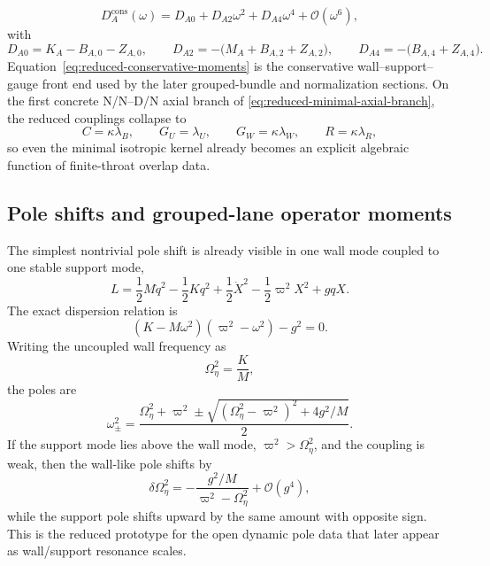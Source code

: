 \documentclass[11pt]{article}
\theoremstyle{definition}
\newcommand{\cO}{\mathcal O}
\begin{document}
\begin{equation}
D_A^{\mathrm{cons}}(\omega)
=
D_{A0}+D_{A2}\omega^2+D_{A4}\omega^4+\cO(\omega^6),
\label{eq:reduced-full-conservative-kernel}
\end{equation}
with
\begin{equation}
D_{A0}=K_A-B_{A,0}-Z_{A,0},
\qquad
D_{A2}=-\bigl(M_A+B_{A,2}+Z_{A,2}\bigr),
\qquad
D_{A4}=-\bigl(B_{A,4}+Z_{A,4}\bigr).
\label{eq:reduced-conservative-moments}
\end{equation}
Equation~\eqref{eq:reduced-conservative-moments} is the conservative wall--support--gauge front end used by the later grouped-bundle and normalization sections. On the first concrete N/N--D/N axial branch of \eqref{eq:reduced-minimal-axial-branch}, the reduced couplings collapse to
\[
C=\kappa\lambda_B,
\qquad
G_U=\lambda_U,
\qquad
G_W=\kappa\lambda_W,
\qquad
R=\kappa\lambda_R,
\]
so even the minimal isotropic kernel already becomes an explicit algebraic function of finite-throat overlap data.

\subsection{Pole shifts and grouped-lane operator moments}

The simplest nontrivial pole shift is already visible in one wall mode coupled to one stable support mode,
\begin{equation}
L
=
\frac12 M\dot q^2
-
\frac12 K q^2
+
\frac12 \dot X^2
-
\frac12 \varpi^2 X^2
+
g qX.
\label{eq:reduced-one-mode-lagrangian}
\end{equation}
The exact dispersion relation is
\begin{equation}
(K-M\omega^2)(\varpi^2-\omega^2)-g^2=0.
\label{eq:reduced-two-pole-dispersion}
\end{equation}
Writing the uncoupled wall frequency as
\begin{equation}
\Omega_\eta^2=\frac{K}{M},
\label{eq:reduced-omega-eta}
\end{equation}
the poles are
\begin{equation}
\omega_\pm^2
=
\frac{\Omega_\eta^2+\varpi^2
\pm
\sqrt{(\Omega_\eta^2-\varpi^2)^2+4g^2/M}}{2}.
\label{eq:reduced-two-pole-spectrum}
\end{equation}
If the support mode lies above the wall mode, $\varpi^2>\Omega_\eta^2$, and the coupling is weak, then the wall-like pole shifts by
\begin{equation}
\delta\Omega_\eta^2
=
-\frac{g^2/M}{\varpi^2-\Omega_\eta^2}+\cO(g^4),
\label{eq:reduced-wall-pole-shift}
\end{equation}
while the support pole shifts upward by the same amount with opposite sign. This is the reduced prototype for the open dynamic pole data that later appear as wall/support resonance scales.
\end{document}
